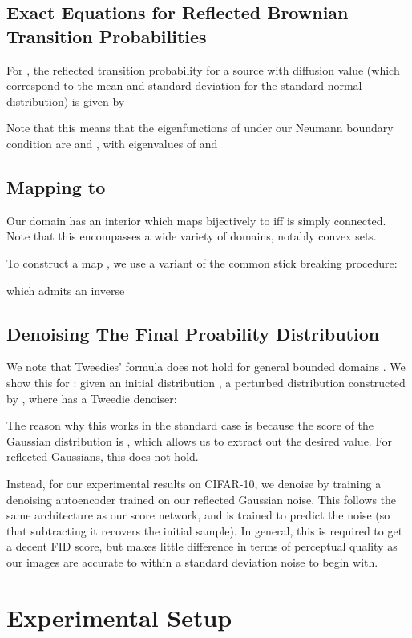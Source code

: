 \documentclass{article}
\theoremstyle{plain}
\theoremstyle{definition}
\theoremstyle{remark}
\begin{document}
\subsection{Exact Equations for Reflected Brownian Transition Probabilities}

For , the reflected transition probability for a source  with diffusion value  (which correspond to the mean and standard deviation for the standard normal distribution) is given by

Note that this means that the eigenfunctions of  under our Neumann boundary condition are  and , with eigenvalues of  and 

\subsection{Mapping  to }\label{sec:app:prac:diffmap}

Our domain  has an interior which maps bijectively to  iff  is simply connected. Note that this encompasses a wide variety of domains, notably convex sets.

To construct a map , we use a variant of the common stick breaking procedure:



which admits an inverse


\subsection{Denoising The Final Proability Distribution} \label{sec:app:prac:denoise}

We note that Tweedies' formula \citep{Efron2011TweediesFA} does not hold for general bounded domains . We show this for : given an initial distribution , a perturbed distribution  constructed by , where  has a Tweedie denoiser:

The reason why this works in the standard case is because the score of the Gaussian distribution is , which allows us to extract out the desired value. For reflected Gaussians, this does not hold.

Instead, for our experimental results on CIFAR-10, we denoise by training a denoising autoencoder \citep{Vincent2008ExtractingAC} trained on our reflected Gaussian noise. This follows the same architecture as our score network, and is trained to predict the noise (so that subtracting it recovers the initial sample). In general, this is required to get a decent FID score, but makes little difference in terms of perceptual quality as our images are accurate to within a  standard deviation noise to begin with. \section{Experimental Setup}
\end{document}
